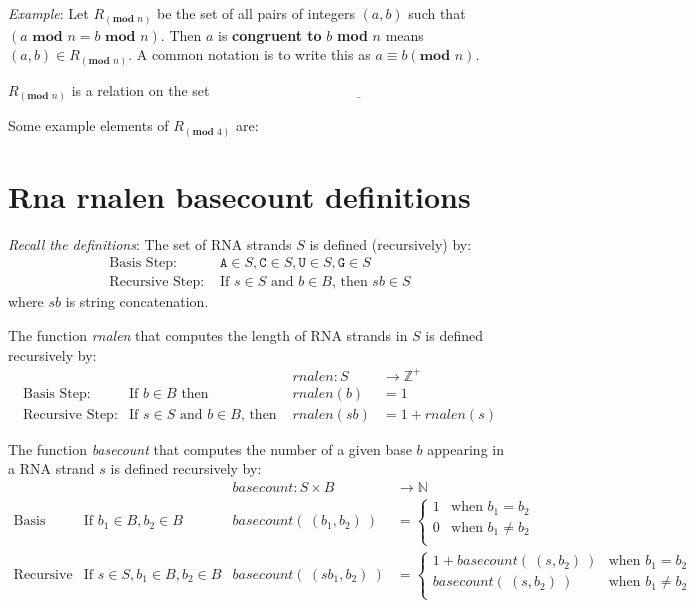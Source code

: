 \documentclass[12pt, oneside]{article}
\newcommand{\A}[0]{\texttt{A}}
\newcommand{\C}[0]{\texttt{C}}
\newcommand{\G}[0]{\texttt{G}}
\newcommand{\U}[0]{\texttt{U}}
\begin{document}
\vfill

{\it Example}: Let $R_{(\textbf{mod } n)}$ be the set of all pairs of integers $(a, b)$ such that $(a \textbf{ mod } n = b \textbf{ mod } n)$.
Then $a$ is {\bf congruent to} $b$ \textbf{mod} $n$ means $(a, b) \in R_{(\textbf{mod } n)}$. A common notation is to write this as $a \equiv b (\textbf{mod } n)$.


$R_{(\textbf{mod } n)}$ is a relation on the set $\underline{\phantom{\mathbb{Z}}\hspace{20em}}$


Some example elements of $R_{(\textbf{mod } 4)}$ are: 

\vfill \vfill
\section*{Rna rnalen basecount definitions}


{\it Recall the definitions}: The set of RNA strands $S$ is defined (recursively) by:
\[
\begin{array}{ll}
\textrm{Basis Step: } & \A \in S, \C \in S, \U \in S, \G \in S \\
\textrm{Recursive Step: } & \textrm{If } s \in S\textrm{ and }b \in B \textrm{, then }sb \in S
\end{array}
\]
where $sb$ is string concatenation.

The function \textit{rnalen} that computes the length of RNA strands in $S$ is defined recursively by:
\[
\begin{array}{llll}
& & \textit{rnalen} : S & \to \mathbb{Z}^+ \\
\textrm{Basis Step:} & \textrm{If } b \in B\textrm{ then } & \textit{rnalen}(b) & = 1 \\
\textrm{Recursive Step:} & \textrm{If } s \in S\textrm{ and }b \in B\textrm{, then  } & \textit{rnalen}(sb) & = 1 + \textit{rnalen}(s)
\end{array}
\]

The function \textit{basecount} that computes the number of a given base 
$b$ appearing in a RNA strand $s$ is defined recursively by:
\[
\begin{array}{llll}
& & \textit{basecount} : S \times B & \to \mathbb{N} \\
\textrm{Basis Step:} &  \textrm{If } b_1 \in B, b_2 \in B & \textit{basecount}(~(b_1, b_2)~) & =
        \begin{cases}
            1 & \textrm{when } b_1 = b_2 \\
            0 & \textrm{when } b_1 \neq b_2 \\
        \end{cases} \\
\textrm{Recursive Step:} & \textrm{If } s \in S, b_1 \in B, b_2 \in B &\textit{basecount}(~(s b_1, b_2)~) & =
        \begin{cases}
            1 + \textit{basecount}(~(s, b_2)~) & \textrm{when } b_1 = b_2 \\
            \textit{basecount}(~(s, b_2)~) & \textrm{when } b_1 \neq b_2 \\
        \end{cases}
\end{array}
\] \vfill
\end{document}
